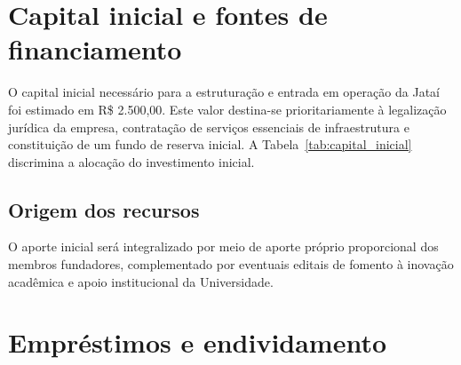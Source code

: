 \documentclass[
  12pt,
  openright,
  oneside,
  a4paper,
  brazilian
]{abntex2}
\begin{document}
\section{Capital inicial e fontes de financiamento}
\label{sec:capital_inicial}

O capital inicial necessário para a estruturação e entrada em operação da Jataí foi estimado em R\$ 2.500,00. Este valor destina-se prioritariamente à legalização jurídica da empresa, contratação de serviços essenciais de infraestrutura e constituição de um fundo de reserva inicial. A Tabela~\ref{tab:capital_inicial} discrimina a alocação do investimento inicial.

\begin{table}[htbp]
\centering
\caption{Discriminação do capital inicial.}
\label{tab:capital_inicial}
\end{table}

\subsection{Origem dos recursos}
O aporte inicial será integralizado por meio de aporte próprio proporcional dos membros fundadores, complementado por eventuais editais de fomento à inovação acadêmica e apoio institucional da Universidade.

\section{Empréstimos e endividamento}
\label{sec:emprestimos}
\end{document}
